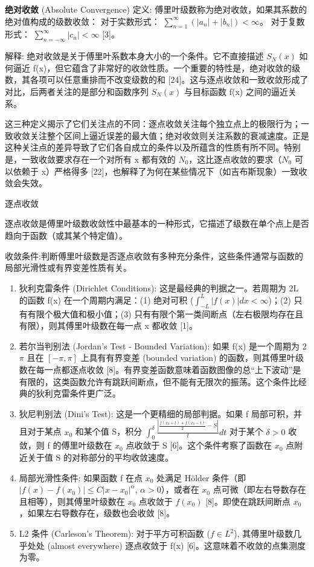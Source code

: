 \begin{definition}
\textbf{绝对收敛} (Absolute Convergence)
定义: 傅里叶级数称为绝对收敛，如果其系数的绝对值构成的级数收敛：
对于实数形式： $\sum_{n=1}^{\infty}(|a_n|+|b_n|)<\infty$。
对于复数形式： $\sum_{n=-\infty}^{\infty}|c_n|<\infty$ [3]。
\end{definition}
解释: 绝对收敛是关于傅里叶系数本身大小的一个条件。它不直接描述 $S_N(x)$ 如何逼近 f(x)，但它蕴含了非常好的收敛性质。一个重要的特性是，绝对收敛的级数，其各项可以任意重排而不改变级数的和 [24]。这与逐点收敛和一致收敛形成了对比，后两者关注的是部分和函数序列 $S_N(x)$ 与目标函数 f(x) 之间的逼近关系。

这三种定义揭示了它们关注点的不同：逐点收敛关注每个独立点上的极限行为；一致收敛关注整个区间上逼近误差的最大值；绝对收敛则关注系数的衰减速度。正是这种关注点的差异导致了它们各自成立的条件以及所蕴含的性质有所不同。特别是，一致收敛要求存在一个对所有 x 都有效的 $N_0$，这比逐点收敛的要求（$N_0$ 可以依赖于 x）严格得多 [22]，也解释了为何在某些情况下（如吉布斯现象）一致收敛会失效。

逐点收敛

逐点收敛是傅里叶级数收敛性中最基本的一种形式，它描述了级数在单个点上是否趋向于函数（或其某个特定值）。

收敛条件:判断傅里叶级数是否逐点收敛有多种充分条件，这些条件通常与函数的局部光滑性或有界变差性质有关。

\begin{enumerate}
	\item 狄利克雷条件 (Dirichlet Conditions): 这是最经典的判据之一。若周期为 2L 的函数 f(x) 在一个周期内满足：(1) 绝对可积 ($\int_{-L}^{L}|f(x)|dx<\infty$)；(2) 只有有限个极大值和极小值；(3) 只有有限个第一类间断点（左右极限均存在且有限），则其傅里叶级数在每一点 x 都收敛 [1]。
	\item 若尔当判别法 (Jordan's Test - Bounded Variation): 如果 f(x) 是一个周期为 2$\pi$ 且在 $[-\pi,\pi]$ 上具有有界变差 (bounded variation) 的函数，则其傅里叶级数在每一点都逐点收敛 [8]。有界变差函数意味着函数图像的总“上下波动”是有限的，这类函数允许有跳跃间断点，但不能有无限次的振荡。这个条件比经典的狄利克雷条件更广泛。
	\item 狄尼判别法 (Dini's Test): 这是一个更精细的局部判据。如果 f 局部可积，并且对于某点 $x_0$ 和某个值 S，积分 $\int_{0}^\delta \frac{| \frac{f(x_0+t)+f(x_0-t)}{2}-S |}{t} dt$ 对于某个 $\delta>0$ 收敛，则 f 的傅里叶级数在 $x_0$ 点收敛于 S [6]。这个条件考察了函数在 $x_0$ 点附近关于值 S 的对称部分的平均收敛速度。
	\item 局部光滑性条件: 如果函数 f 在点 $x_0$ 处满足 Hölder 条件（即 $|f(x)−f(x_0)|\leq C|x−x_0|^\alpha$, $\alpha>0$），或者在 $x_0$ 点可微（即左右导数存在且相等），则其傅里叶级数在 $x_0$ 点收敛于 $f(x_0)$ [8]。即使在跳跃间断点 $x_0$，如果左右导数存在，级数也会收敛 [8]。
	\item L2 条件 (Carleson's Theorem): 对于平方可积函数 ($f\in L^2$), 其傅里叶级数几乎处处 (almost everywhere) 逐点收敛于 f(x) [6]。这意味着不收敛的点集测度为零。
\end{enumerate}

